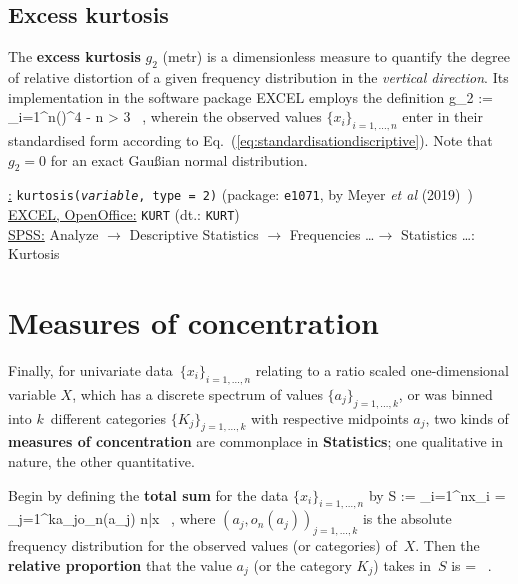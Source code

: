 \subsection[Excess kurtosis]{Excess kurtosis}
The \textbf{excess kurtosis} $g_{2}$ (metr) is a dimensionless 
measure to quantify the degree of relative distortion of a given 
frequency distribution in the \textit{vertical direction}. Its 
implementation in the software package EXCEL employs the definition
%
\be
{}
g_{2} := 
\sum_{i=1}^{n}\left(\right)^{4} - 
\qquad{}\quad n > 3 \ ,
\ee
%
wherein the observed values $\{x_{i}\}_{i=1,\ldots,n}$ enter in
their standardised form according to 
Eq.~(\ref{eq:standardisationdiscriptive}). Note that $g_{2}=0$ for 
an exact Gau\ss ian normal distribution.

\medskip
\noindent
\underline{\R:} \texttt{kurtosis(\textit{variable},
type = 2)} (package: \texttt{e1071}, by Meyer \textit{et al}
(2019)~) \\
\underline{EXCEL, OpenOffice:} \texttt{KURT} (dt.:
\texttt{KURT}) \\
\underline{SPSS:} Analyze $\rightarrow$ Descriptive Statistics
$\rightarrow$ Frequencies \ldots $\rightarrow$ Statistics
\ldots: Kurtosis

\section[Measures of concentration]{Measures of concentration}
Finally, for univariate data~$\{x_{i}\}_{i=1,\ldots,n}$ relating 
to a ratio scaled one-dimensional variable $X$, which has a 
discrete spectrum of values $\{a_{j}\}_{j=1,\ldots,k}$, or was 
binned into $k$~different categories $\{K_{j}\}_{j=1,\ldots,k}$ 
with respective midpoints $a_{j}$, two kinds of \textbf{measures of 
concentration} are commonplace in \textbf{Statistics}; one 
qualitative in nature, the other quantitative.


\medskip
\noindent
Begin by defining the \textbf{total sum} for the data 
$\{x_{i}\}_{i=1,\ldots,n}$ by
%
\be
{}
S := \sum_{i=1}^{n}x_{i}
= \sum_{j=1}^{k}a_{j}o_{n}(a_{j})
 n\bar{x} \ ,
\ee
%
where $(a_{j},o_{n}(a_{j}))_{j=1,\ldots,k}$ is the absolute 
frequency distribution for the observed values (or categories) 
of~$X$. Then the \textbf{relative proportion} that the value
$a_{j}$ (or the category $K_{j}$) takes in~$S$ is
%
\be
{}
 =  \ .
\ee
%

